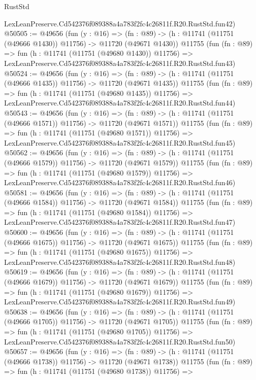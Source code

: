 \begin{lexlean}{RustStd}
\begin{coremodule}
    LexLeanPreserve.Cd542376f089388a4a783f2fc4c26811f.R20.RustStd.fun42)
@50505 := @49656
    (fun (y : @16) =>
    (fn : @89) -> (h : @11741 (@11751 (@49666 @1430)) @11756) -> @11720 (@49671 @1430))
    @11755
    (fun (fn : @89) =>
    fun (h : @11741 (@11751 (@49680 @1430)) @11756) =>
    LexLeanPreserve.Cd542376f089388a4a783f2fc4c26811f.R20.RustStd.fun43)
@50524 := @49656
    (fun (y : @16) =>
    (fn : @89) -> (h : @11741 (@11751 (@49666 @1435)) @11756) -> @11720 (@49671 @1435))
    @11755
    (fun (fn : @89) =>
    fun (h : @11741 (@11751 (@49680 @1435)) @11756) =>
    LexLeanPreserve.Cd542376f089388a4a783f2fc4c26811f.R20.RustStd.fun44)
@50543 := @49656
    (fun (y : @16) =>
    (fn : @89) -> (h : @11741 (@11751 (@49666 @1571)) @11756) -> @11720 (@49671 @1571))
    @11755
    (fun (fn : @89) =>
    fun (h : @11741 (@11751 (@49680 @1571)) @11756) =>
    LexLeanPreserve.Cd542376f089388a4a783f2fc4c26811f.R20.RustStd.fun45)
@50562 := @49656
    (fun (y : @16) =>
    (fn : @89) -> (h : @11741 (@11751 (@49666 @1579)) @11756) -> @11720 (@49671 @1579))
    @11755
    (fun (fn : @89) =>
    fun (h : @11741 (@11751 (@49680 @1579)) @11756) =>
    LexLeanPreserve.Cd542376f089388a4a783f2fc4c26811f.R20.RustStd.fun46)
@50581 := @49656
    (fun (y : @16) =>
    (fn : @89) -> (h : @11741 (@11751 (@49666 @1584)) @11756) -> @11720 (@49671 @1584))
    @11755
    (fun (fn : @89) =>
    fun (h : @11741 (@11751 (@49680 @1584)) @11756) =>
    LexLeanPreserve.Cd542376f089388a4a783f2fc4c26811f.R20.RustStd.fun47)
@50600 := @49656
    (fun (y : @16) =>
    (fn : @89) -> (h : @11741 (@11751 (@49666 @1675)) @11756) -> @11720 (@49671 @1675))
    @11755
    (fun (fn : @89) =>
    fun (h : @11741 (@11751 (@49680 @1675)) @11756) =>
    LexLeanPreserve.Cd542376f089388a4a783f2fc4c26811f.R20.RustStd.fun48)
@50619 := @49656
    (fun (y : @16) =>
    (fn : @89) -> (h : @11741 (@11751 (@49666 @1679)) @11756) -> @11720 (@49671 @1679))
    @11755
    (fun (fn : @89) =>
    fun (h : @11741 (@11751 (@49680 @1679)) @11756) =>
    LexLeanPreserve.Cd542376f089388a4a783f2fc4c26811f.R20.RustStd.fun49)
@50638 := @49656
    (fun (y : @16) =>
    (fn : @89) -> (h : @11741 (@11751 (@49666 @1705)) @11756) -> @11720 (@49671 @1705))
    @11755
    (fun (fn : @89) =>
    fun (h : @11741 (@11751 (@49680 @1705)) @11756) =>
    LexLeanPreserve.Cd542376f089388a4a783f2fc4c26811f.R20.RustStd.fun50)
@50657 := @49656
    (fun (y : @16) =>
    (fn : @89) -> (h : @11741 (@11751 (@49666 @1738)) @11756) -> @11720 (@49671 @1738))
    @11755
    (fun (fn : @89) =>
    fun (h : @11741 (@11751 (@49680 @1738)) @11756) =>

\end{coremodule}
\end{lexlean}
